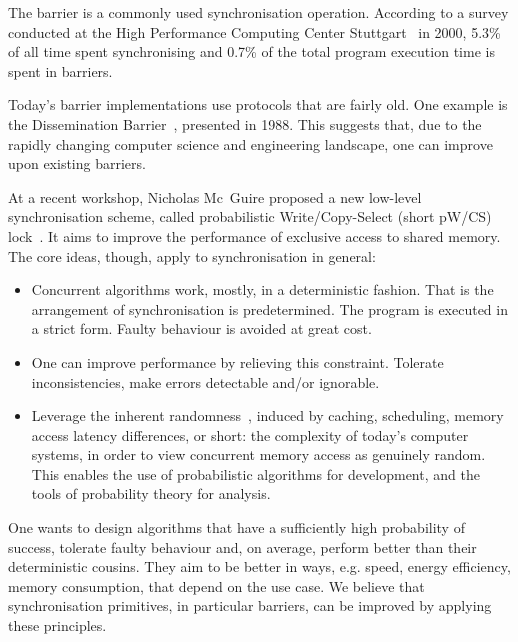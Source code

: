 \documentclass[a4paper, 10pt]{article}
\begin{document}
The barrier is a commonly used synchronisation operation. According to a survey conducted at the High Performance Computing Center Stuttgart~\cite{rab00} in 2000, 5.3\% of all time spent synchronising and 0.7\% of the total program execution time is spent in barriers.

Today's barrier implementations use protocols that are fairly old. One example is the Dissemination Barrier~\cite{hensgen1988}, presented in 1988. This suggests that, due to the rapidly changing computer science and engineering landscape, one can improve upon existing barriers.

At a recent workshop, Nicholas Mc~Guire proposed a new low-level synchronisation scheme, called probabilistic Write/Copy-Select (short pW/CS) lock~\cite{pwcs}. It aims to improve the performance of exclusive access to shared memory. The core ideas, though, apply to synchronisation in general:
\begin{itemize}
	\item Concurrent algorithms work, mostly, in a deterministic fashion. That is the arrangement of synchronisation is predetermined. The program is executed in a strict form. Faulty behaviour is avoided at great cost.
	\item One can improve performance by relieving this constraint. Tolerate inconsistencies, make errors detectable and/or ignorable.
	\item Leverage the inherent randomness~\cite{mcg09}, induced by caching, scheduling, memory access latency differences, or short: the complexity of today's computer systems, in order to view concurrent memory access as genuinely random. This enables the use of probabilistic algorithms for development, and the tools of probability theory for analysis.
\end{itemize}
One wants to design algorithms that have a sufficiently high probability of success, tolerate faulty behaviour and, on average, perform better than their deterministic cousins. They aim to be better in ways, e.g. speed, energy efficiency, memory consumption, that depend on the use case.
We believe that synchronisation primitives, in particular barriers, can be improved by applying these principles.
\end{document}
